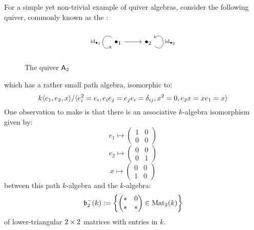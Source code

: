             \begin{example} \label{example: path_algebras_of_A_n_quivers}
                For a simple yet non-trivial example of quiver algebras, consider the following quiver, commonly known as the :
                    \begin{figure}[H]
                        \centering
                        $$
                            \begin{tikzcd}
                                {\bullet_1} \arrow["\id_{\bullet_1}"', loop, distance=2em, in=215, out=145] \arrow[r] & {\bullet_2} \arrow["\id_{\bullet_2}"', loop, distance=2em, in=35, out=325]
                            \end{tikzcd}
                        $$
                        \caption{The quiver $\mathsf{A}_2$}
                        \label{fig: A_2_quiver}
                    \end{figure}
                which has a rather small path algebra, isomorphic to:
                    $$k\langle e_1, e_2, x\rangle/\langle e_i^2 = e_i, e_i e_j = e_j e_i = \delta_{ij}, x^2 = 0, e_2 x = x e_1 = x\rangle$$
                One observation to make is that there is an associative $k$-algebra isomorphism given by:
                    $$e_1 \mapsto \begin{pmatrix} 1 & 0 \\ 0 & 0 \end{pmatrix}$$
                    $$e_2 \mapsto \begin{pmatrix} 0 & 0 \\ 0 & 1 \end{pmatrix}$$
                    $$x \mapsto \begin{pmatrix} 0 & 0 \\ 1 & 0 \end{pmatrix}$$
                between this path $k$-algebra and the $k$-algebra:
                    $$\mathfrak{b}_2^-(k) := \left\{ \begin{pmatrix} * & 0 \\ * & * \end{pmatrix} \in \mathrm{Mat}_2(k) \right\}$$
                of lower-triangular $2 \x 2$ matrices with entries in $k$.
                    

\end{example}
